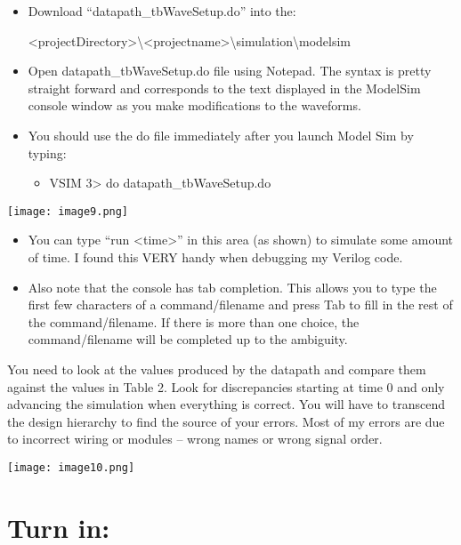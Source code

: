 \begin{itemize}
\item
  Download ``datapath\_tbWaveSetup.do'' into the:
  
  \textless projectDirectory\textgreater\textbackslash\textless projectname\textgreater\textbackslash simulation\textbackslash modelsim
\item
  Open datapath\_tbWaveSetup.do file using Notepad. The syntax is pretty
  straight forward and corresponds to the text displayed in the ModelSim
  console window as you make modifications to the waveforms.
\item
  You should use the do file immediately after you launch Model Sim by
  typing:

  \begin{itemize}
  \item
    VSIM 3\textgreater{} do datapath\_tbWaveSetup.do
  \end{itemize}
\end{itemize}


\texttt{[image:  image9.png]}


\begin{itemize}
\item
  You can type ``run \textless time\textgreater'' in this area (as
  shown) to simulate some amount of time. I found this VERY handy when
  debugging my Verilog code.
\item
  Also note that the console has tab completion. This allows you to type
  the first few characters of a command/filename and press Tab to fill
  in the rest of the command/filename. If there is more than one choice,
  the command/filename will be completed up to the ambiguity.
\end{itemize}

You need to look at the values produced by the datapath and compare them
against the values in Table 2. Look for discrepancies starting at time 0
and only advancing the simulation when everything is correct. You will
have to transcend the design hierarchy to find the source of your
errors. Most of my errors are due to incorrect wiring or modules --
wrong names or wrong signal order.

\texttt{[image:  image10.png]}

\hypertarget{turn-in}{%
\section{Turn in:}\label{turn-in}}

